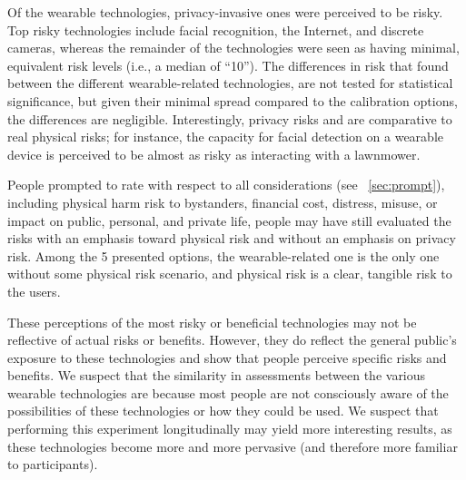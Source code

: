 Of the wearable technologies, privacy-invasive ones were perceived to be risky. Top risky technologies include facial recognition, the Internet, and discrete cameras, whereas the remainder of the technologies were seen as having minimal,  equivalent risk levels (i.e., a median of ``10''). The differences in risk that found between the different wearable-related technologies, are not tested for statistical significance, but given their minimal spread compared to the calibration options, the differences are negligible. Interestingly, privacy risks and are comparative to real physical risks; for instance, the capacity for facial detection on a wearable device is perceived to be almost as risky as interacting with a lawnmower. 

People prompted to rate with respect to all considerations (see ~\ref{sec:prompt}), including physical harm risk to bystanders, financial cost, distress, misuse, or impact on public, personal, and private life, people may have still evaluated the risks with an emphasis toward physical risk and without an emphasis on privacy risk. Among the 5 presented options, the wearable-related one is the only one without some physical risk scenario, and physical risk is a clear, tangible risk to the users. 

These perceptions of the most risky or beneficial technologies may not be reflective of actual risks or benefits. However, they do reflect the general public's exposure to these technologies and show that people perceive specific risks and benefits. We suspect that the similarity in assessments between the various wearable technologies are because most people are not consciously aware of the possibilities of these technologies or how they could be used. We suspect that performing this experiment longitudinally may yield more interesting results, as these technologies become more and more pervasive (and therefore more familiar to participants).